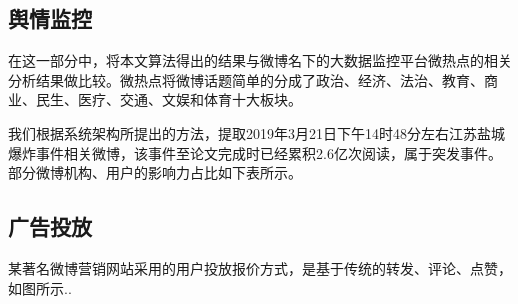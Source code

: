 \subsection{舆情监控}
在这一部分中，将本文算法得出的结果与微博名下的大数据监控平台微热点的相关分析结果做比较。微热点将微博话题简单的分成了政治、经济、法治、教育、商业、民生、医疗、交通、文娱和体育十大板块。

我们根据系统架构所提出的方法，提取2019年3月21日下午14时48分左右江苏盐城爆炸事件相关微博，该事件至论文完成时已经累积2.6亿次阅读，属于突发事件。部分微博机构、用户的影响力占比如下表所示。





\subsection{广告投放}

某著名微博营销网站采用的用户投放报价方式，是基于传统的转发、评论、点赞，如图所示..

